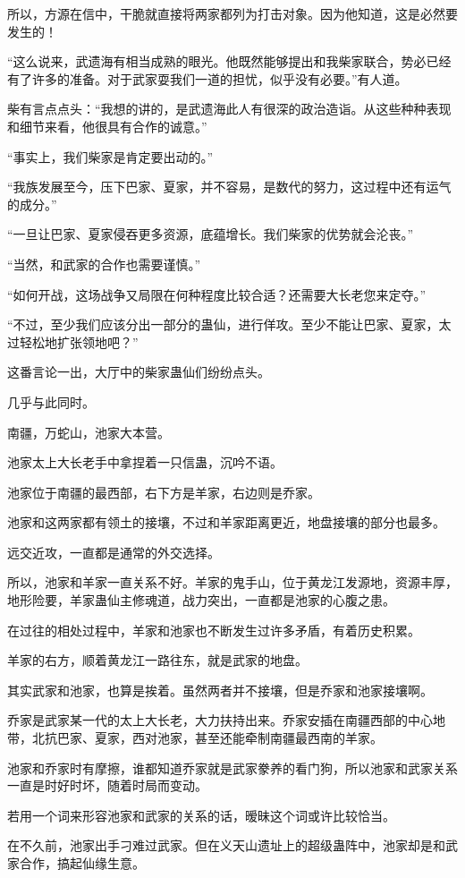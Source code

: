 \begin{this_body}
所以，方源在信中，干脆就直接将两家都列为打击对象。因为他知道，这是必然要发生的！

“这么说来，武遗海有相当成熟的眼光。他既然能够提出和我柴家联合，势必已经有了许多的准备。对于武家耍我们一道的担忧，似乎没有必要。”有人道。

柴有言点点头：“我想的讲的，是武遗海此人有很深的政治造诣。从这些种种表现和细节来看，他很具有合作的诚意。”

“事实上，我们柴家是肯定要出动的。”

“我族发展至今，压下巴家、夏家，并不容易，是数代的努力，这过程中还有运气的成分。”

“一旦让巴家、夏家侵吞更多资源，底蕴增长。我们柴家的优势就会沦丧。”

“当然，和武家的合作也需要谨慎。”

“如何开战，这场战争又局限在何种程度比较合适？还需要大长老您来定夺。”

“不过，至少我们应该分出一部分的蛊仙，进行佯攻。至少不能让巴家、夏家，太过轻松地扩张领地吧？”

这番言论一出，大厅中的柴家蛊仙们纷纷点头。

几乎与此同时。

南疆，万蛇山，池家大本营。

池家太上大长老手中拿捏着一只信蛊，沉吟不语。

池家位于南疆的最西部，右下方是羊家，右边则是乔家。

池家和这两家都有领土的接壤，不过和羊家距离更近，地盘接壤的部分也最多。

远交近攻，一直都是通常的外交选择。

所以，池家和羊家一直关系不好。羊家的鬼手山，位于黄龙江发源地，资源丰厚，地形险要，羊家蛊仙主修魂道，战力突出，一直都是池家的心腹之患。

在过往的相处过程中，羊家和池家也不断发生过许多矛盾，有着历史积累。

羊家的右方，顺着黄龙江一路往东，就是武家的地盘。

其实武家和池家，也算是挨着。虽然两者并不接壤，但是乔家和池家接壤啊。

乔家是武家某一代的太上大长老，大力扶持出来。乔家安插在南疆西部的中心地带，北抗巴家、夏家，西对池家，甚至还能牵制南疆最西南的羊家。

池家和乔家时有摩擦，谁都知道乔家就是武家豢养的看门狗，所以池家和武家关系一直是时好时坏，随着时局而变动。

若用一个词来形容池家和武家的关系的话，暧昧这个词或许比较恰当。

在不久前，池家出手刁难过武家。但在义天山遗址上的超级蛊阵中，池家却是和武家合作，搞起仙缘生意。


\end{this_body}

